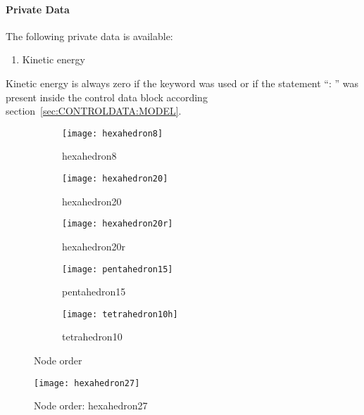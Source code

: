 \paragraph{Private Data}
\label{sec:EL:SOLID:PRIVATE}
The following private data is available:
\begin{enumerate}
\item {} Kinetic energy
\end{enumerate}
Kinetic energy is always zero if the keyword  was used or if the statement
``: '' was present inside the control data block according
section~\ref{sec:CONTROLDATA:MODEL}.

\begin{figure}[htb]
  \begin{subfigure}{0.5\textwidth}
    \centering
    \texttt{[image: hexahedron8]}
    \caption{hexahedron8}
    \label{fig:EL:SOLID:HEXAHEDRON8}
  \end{subfigure}
  \begin{subfigure}{0.5\textwidth}
    \centering
    \texttt{[image: hexahedron20]}
    \caption{hexahedron20}
    \label{fig:EL:SOLID:HEXAHEDRON20}
  \end{subfigure}
  \begin{subfigure}{0.5\textwidth}
    \centering
    \texttt{[image: hexahedron20r]}
    \caption{hexahedron20r}
    \label{fig:EL:SOLID:HEXAHEDRON20R}
  \end{subfigure}
  \begin{subfigure}{0.5\textwidth}
    \centering
    \texttt{[image: pentahedron15]}
    \caption{pentahedron15}
    \label{fig:EL:SOLID:PENTAHEDRON15}
  \end{subfigure}
  \begin{subfigure}{0.5\textwidth}
    \centering
    \texttt{[image: tetrahedron10h]}
    \caption{tetrahedron10}
    \label{fig:EL:SOLID:TETRAHEDRON10H}
  \end{subfigure}
  \caption{Node order}
  \label{fig:EL:SOLID:NODE_ORDER}
\end{figure}

\begin{figure}[htb]
\centering
\texttt{[image: hexahedron27]}
\caption{Node order: hexahedron27}
\label{fig:EL:SOLID:HEXAHEDRON27}
\end{figure}

